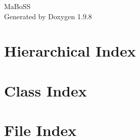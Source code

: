 \documentclass[twoside]{book}
\newcommand{\+}{\discretionary{\mbox{\scriptsize$\hookleftarrow$}}{}{}}
\newcommand{\clearemptydoublepage}{%
    \newpage{\pagestyle{empty}\cleardoublepage}%
  }
\begin{document}
  \raggedbottom
    \hypersetup{pageanchor=false,
                bookmarksnumbered=true,
                pdfencoding=unicode
               }
  \begin{titlepage}
  \vspace*{7cm}
  \begin{center}%
  {\Large Ma\+Bo\+SS}\\
  \vspace*{1cm}
  {\large Generated by Doxygen 1.9.8}\\
  \end{center}
  \end{titlepage}
  \clearemptydoublepage
  \tableofcontents
  \clearemptydoublepage
  \hypersetup{pageanchor=true}
\chapter{Hierarchical Index}

\chapter{Class Index}

\chapter{File Index}

\end{document}
